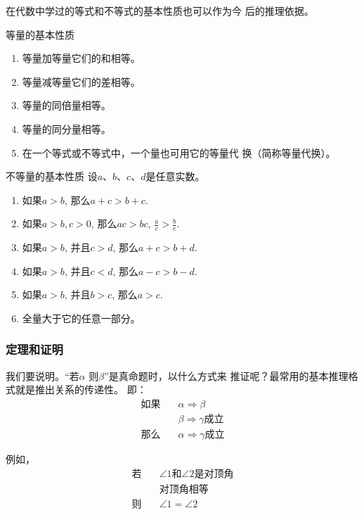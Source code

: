 在代数中学过的等式和不等式的基本性质也可以作为今
后的推理依据。
\begin{blk}{等量的基本性质}
\begin{enumerate}
	\item 等量加等量它们的和相等。
	\item  等量减等量它们的差相等。
	\item 等量的同倍量相等。
	\item 等量的同分量相等。
	\item 在一个等式或不等式中，一个量也可用它的等量代
	换（简称等量代换）。
\end{enumerate}
\end{blk}

\begin{blk}{不等量的基本性质}
	设$a$、$b$、$c$、$d$是任意实数。
\begin{enumerate}
\item 如果$a>b$, 那么$a+c>b+c$.
\item 如果$a>b, c>0$, 那么$ac>bc$, $\frac{a}{c}>\frac{b}{c}$.
\item  如果$a>b$, 并且$c>d$, 那么$a+c>b+d$.
\item 如果$a>b$, 并且$c<d$, 那么$a-c>b-d$.
\item 如果$a>b$, 并且$b>c$, 那么$a>c$.
\item 全量大于它的任意一部分。
\end{enumerate}
\end{blk}

\subsubsection{定理和证明}
我们要说明。“若$\alpha$ 则$\beta$”是真命题时，以什么方式来
推证呢？最常用的基本推理格式就是推出关系的传递性。
即：
\begin{align*}
	\text{如果}& \quad \alpha \Rightarrow \beta \tag{1}\\
	& \quad \beta \Rightarrow \gamma \text{成立} \tag{2}\\
\text{那么}&  \quad \alpha \Rightarrow \gamma \text{成立}\tag{3}
\end{align*}

例如，
\begin{align*}
	\text{若}& \quad \text{$\angle 1$和$\angle 2$是对顶角} \tag{1}\\
	& \quad \text{对顶角相等} \tag{2}\\
\text{则}&  \quad \angle 1=\angle 2 \tag{3}
\end{align*}


